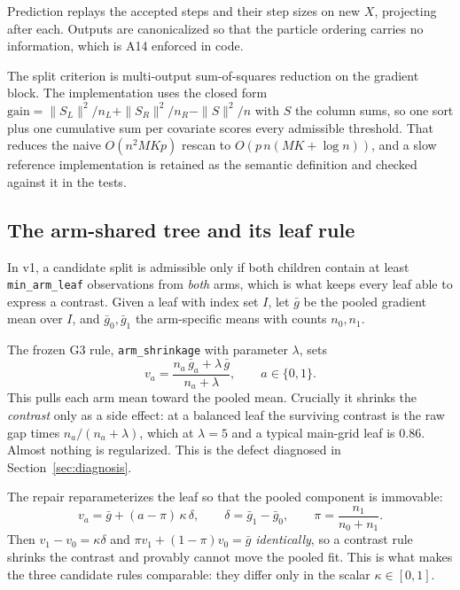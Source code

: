 \documentclass[11pt,a4paper]{article}
\theoremstyle{definition}
\theoremstyle{remark}
\begin{document}
Prediction replays the accepted steps and their step sizes on new $X$, projecting
after each. Outputs are canonicalized so that the particle ordering carries no
information, which is A14 enforced in code.

The split criterion is multi-output sum-of-squares reduction on the gradient
block. The implementation uses the closed form
$\text{gain} = \|S_L\|^2/n_L + \|S_R\|^2/n_R - \|S\|^2/n$ with $S$ the column
sums, so one sort plus one cumulative sum per covariate scores every admissible
threshold. That reduces the naive $O(n^2 M K p)$ rescan to
$O(p\, n (MK + \log n))$, and a slow reference implementation is retained as the
semantic definition and checked against it in the tests.

\subsection{The arm-shared tree and its leaf rule}
\label{sec:armtree}

In v1, a candidate split is admissible only if both children contain at least
\texttt{min\_arm\_leaf} observations from \emph{both} arms, which is what keeps
every leaf able to express a contrast. Given a leaf with index set $I$, let
$\bar g$ be the pooled gradient mean over $I$, and $\bar g_0, \bar g_1$ the
arm-specific means with counts $n_0, n_1$.

The frozen G3 rule, \texttt{arm\_shrinkage} with parameter $\lambda$, sets
\[
v_a = \frac{n_a\,\bar g_a + \lambda\,\bar g}{n_a + \lambda},
\qquad a \in \{0,1\}.
\]
This pulls each arm mean toward the pooled mean. Crucially it shrinks the
\emph{contrast} only as a side effect: at a balanced leaf the surviving contrast
is the raw gap times $n_a/(n_a + \lambda)$, which at $\lambda = 5$ and a typical
main-grid leaf is $0.86$. Almost nothing is regularized. This is the defect
diagnosed in Section~\ref{sec:diagnosis}.

The repair reparameterizes the leaf so that the pooled component is immovable:
\begin{equation}
v_a = \bar g + (a - \pi)\,\kappa\,\delta,
\qquad
\delta = \bar g_1 - \bar g_0,
\qquad
\pi = \frac{n_1}{n_0 + n_1} .
\label{eq:reparam}
\end{equation}
Then $v_1 - v_0 = \kappa \delta$ and $\pi v_1 + (1-\pi) v_0 = \bar g$
\emph{identically}, so a contrast rule shrinks the contrast and provably cannot
move the pooled fit. This is what makes the three candidate rules comparable:
they differ only in the scalar $\kappa \in [0,1]$.
\end{document}
